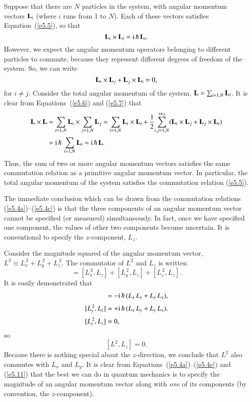 Suppose that there are $N$ particles in the system, with
angular momentum vectors ${\bf L}_i$ (where $i$ runs from 1 to $N$). 
Each of these vectors satisfies Equation~(\ref{e5.5}), so that
\begin{equation}\label{e5.6}
{\bf L}_i\times {\bf L}_i = {\rm i}\,\hbar \,{\bf L}_i.
\end{equation}
However, we expect  the angular momentum operators
 belonging to  different particles to commute, because they represent different
degrees of freedom of the system. So,
we can write
\begin{equation}\label{e5.7}
{\bf L}_i\times {\bf L}_j + {\bf L}_j\times {\bf L}_i =0,
\end{equation}
for $i\neq j$. Consider the total angular momentum of the system, 
${\bf L} = \sum_{i=1,N} {\bf L}_i$. It is clear from Equations~(\ref{e5.6}) and (\ref{e5.7})
 that
\begin{align}
{\bf L} \times {\bf L}& = \sum_{i=1,N} {\bf L}_i\times
\sum_{j=1,N} {\bf L}_j  = \sum_{i=1,N} {\bf L}_i \times
{\bf L}_i +\frac{1}{2}\!\sum_{i,j = 1,N}^{i\neq j}(  {\bf L}_i\times {\bf L}_j + {\bf L}_j\times {\bf L}_i) \nonumber\\[0.5ex]
&= {\rm i}\,\hbar\,\sum_{i=1,N} {\bf L}_i = {\rm i}\,\hbar \,{\bf L}.\label{e5.8}
\end{align}
Thus, the sum of two or more angular momentum vectors satisfies the
same commutation relation as a primitive  angular momentum vector.
In particular, the total angular momentum of the system satisfies the
commutation relation (\ref{e5.5}).

The immediate conclusion which can be drawn from the commutation relations
(\ref{e5.4a})--(\ref{e5.4c}) is that the three components of an angular momentum vector cannot
be specified (or measured) simultaneously. In fact,  once we have specified one
component, the values of other two components become uncertain.  It is
conventional to specify the $z$-component, $L_z$. 

Consider the magnitude squared of the angular momentum vector, $L^2 \equiv
L_x^{\,2} + L_y^{\,2}+L_z^{\,2}$. The commutator of $L^2$ and $L_z$ is
written
\begin{equation}
[L^2, L_z] = [L_x^{\,2}, L_z] + [L_y^{\,2}, L_z] + [L_z^{\,2}, L_z].
\end{equation}
It is easily demonstrated that
\begin{align}
[L_x^{\,2}, L_z] &= -{\rm i}\,\hbar\,(L_x\, L_y + L_y \,L_x),\\[0.5ex]
[L_y^{\,2}, L_z] &= +{\rm i}\,\hbar\,(L_x\,L_y + L_y \,L_x),\\[0.5ex]
[L_z^{\,2}, L_z] &= 0,
\end{align}
so 
\begin{equation}\label{e5.11}
[L^2, L_z] = 0.
\end{equation}
Because there is nothing special about the $z$-direction, we conclude that $L^2$ also
commutes with $L_x$ and $L_y$. It is clear from Equations~(\ref{e5.4a})--(\ref{e5.4c}) and
(\ref{e5.11}) that the best we
can do in quantum mechanics is to specify the 
magnitude of an angular momentum vector 
along with {\em one}\/ of its components (by convention, the $z$-component).

